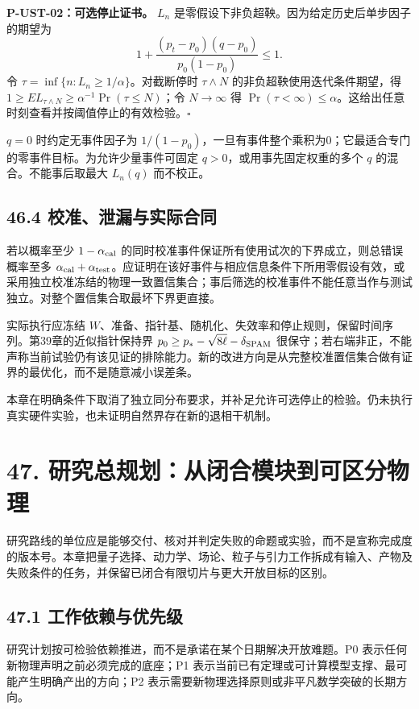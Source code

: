 \documentclass[
  11pt,
  oneside]{book}
\begin{document}
\protect\hypertarget{p-ust-02}{}{}

\textbf{P-UST-02：可选停止证书。} \(L_n\)
是零假设下非负超鞅。因为给定历史后单步因子的期望为 \[
1+\frac{(p_t-p_0)(q-p_0)}{p_0(1-p_0)}\le1.
\] 令 \(\tau=\inf\{n:L_n\ge1/\alpha\}\)。对截断停时 \(\tau\wedge N\)
的非负超鞅使用迭代条件期望，得
\(1\ge E L_{\tau\wedge N}\ge\alpha^{-1}\Pr(\tau\le N)\)；令
\(N\to\infty\) 得
\(\Pr(\tau<\infty)\le\alpha\)。这给出任意时刻查看并按阈值停止的有效检验。\(\square\)

\(q=0\) 时约定无事件因子为
\(1/(1-p_0)\)，一旦有事件整个乘积为0；它最适合专门的零事件目标。为允许少量事件可固定
\(q>0\)，或用事先固定权重的多个 \(q\) 的混合。不能事后取最大 \(L_n(q)\)
而不校正。

\section{46.4 校准、泄漏与实际合同}

若以概率至少 \(1-\alpha_{\rm cal}\)
的同时校准事件保证所有使用试次的下界成立，则总错误概率至多
\(\alpha_{\rm cal}+\alpha_{\rm test}\)。应证明在该好事件与相应信息条件下所用零假设有效，或采用独立校准冻结的物理一致置信集合；事后筛选的校准事件不能任意当作与测试独立。对整个置信集合取最坏下界更直接。

实际执行应冻结
\(W\)、准备、指针基、随机化、失效率和停止规则，保留时间序列。第39章的近似指针保持界
\(p_0\ge p_*-\sqrt{8\ell}-\delta_{\rm SPAM}\)
很保守；若右端非正，不能声称当前试验仍有该见证的排除能力。新的改进方向是从完整校准置信集合做有证界的最优化，而不是随意减小误差条。

本章在明确条件下取消了独立同分布要求，并补足允许可选停止的检验。仍未执行真实硬件实验，也未证明自然界存在新的退相干机制。

\chapter{47. 研究总规划：从闭合模块到可区分物理}\label{ch-47}\hypertarget{ch-47}{}

研究路线的单位应是能够交付、核对并判定失败的命题或实验，而不是宣称完成度的版本号。本章把量子选择、动力学、场论、粒子与引力工作拆成有输入、产物及失败条件的任务，并保留已闭合有限切片与更大开放目标的区别。

\section{47.1 工作依赖与优先级}

研究计划按可检验依赖推进，而不是承诺在某个日期解决开放难题。P0
表示任何新物理声明之前必须完成的底座；P1
表示当前已有定理或可计算模型支撑、最可能产生明确产出的方向；P2
表示需要新物理选择原则或非平凡数学突破的长期方向。
\end{document}
